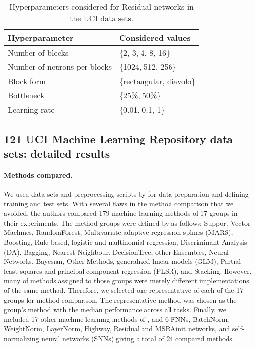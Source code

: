 \documentclass{article}
\begin{document}
\begin{table}[htp]
\begin{center}
\caption{Hyperparameters considered for Residual networks in the UCI data sets.}

\begin{tabular}{ll}
\toprule
Hyperparameter  & Considered values \\ 
\midrule
  Number of blocks & \{2, 3, 4, 8, 16\} \\
  Number of neurons per blocks & \{1024, 512, 256\} \\
  Block form & \{rectangular, diavolo\} \\
  Bottleneck & \{25\%, 50\%\} \\
  Learning rate & \{0.01, 0.1, 1\} \\
\bottomrule
\end{tabular}
\end{center}

\end{table}



\clearpage

\subsection{121 UCI Machine Learning Repository data sets: detailed results}

\paragraph{Methods compared.} 
We used data sets and preprocessing scripts by \citet{bib:Fernandez2014} for data preparation and
defining training and test sets. With several flaws in the method comparison\citep{bib:Wainberg2016} that we avoided, 
the authors compared 179 machine learning methods of 17 groups in their experiments. 
The method groups were defined by \citet{bib:Fernandez2014} as follows:
Support Vector Machines, RandomForest, Multivariate adaptive regression splines (MARS), 
Boosting, Rule-based, logistic and multinomial regression,
Discriminant Analysis (DA), Bagging, 
Nearest Neighbour, DecisionTree, other Ensembles, Neural Networks, Bayesian, Other Methods,
generalized linear models (GLM), Partial least squares and principal component regression (PLSR), and Stacking.
However, many of methods assigned to those groups were merely different implementations of the 
same method. Therefore, we selected one representative of each of the 17 groups for method 
comparison. The representative method was chosen as the group's method with the median performance 
across all tasks. Finally, we included 17 other machine learning methods of \citet{bib:Fernandez2014},
and 6 FNNs, BatchNorm, WeightNorm, LayerNorm, 
Highway, Residual and MSRAinit networks, and self-normalizing neural networks (SNNs) giving a total of 24 compared methods. 
\end{document}
